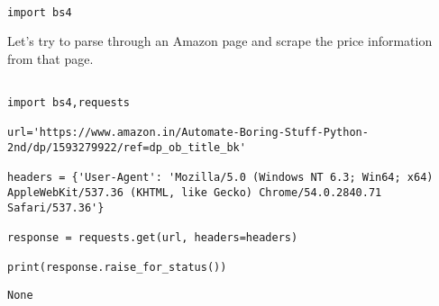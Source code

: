 \documentclass[11pt]{article}
\begin{document}
\begin{verbatim}

import bs4

\end{verbatim}

Let's try to parse through an Amazon page and scrape the price information from that page.

\begin{verbatim}

import bs4,requests

url='https://www.amazon.in/Automate-Boring-Stuff-Python-2nd/dp/1593279922/ref=dp_ob_title_bk'

headers = {'User-Agent': 'Mozilla/5.0 (Windows NT 6.3; Win64; x64) AppleWebKit/537.36 (KHTML, like Gecko) Chrome/54.0.2840.71 Safari/537.36'}

response = requests.get(url, headers=headers)

print(response.raise_for_status())

\end{verbatim}

\begin{verbatim}
None
\end{verbatim}
\end{document}
